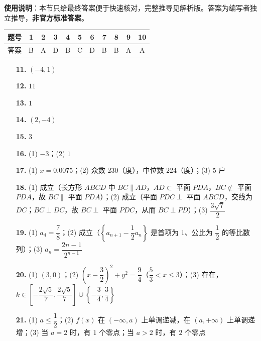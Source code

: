 
\begin{gknotice}
\textbf{使用说明}：本节只给最终答案便于快速核对，完整推导见解析版。答案为编写者独立推导，\textbf{非官方标准答案}。
\end{gknotice}

\begin{center}\begin{tabular}{ccccccccccc}
\toprule
题号 & 1 & 2 & 3 & 4 & 5 & 6 & 7 & 8 & 9 & 10 \\
\midrule
答案 & B & A & D & B & C & D & B & B & A & A \\
\bottomrule
\end{tabular}\end{center}

\begin{itemize}[leftmargin=2.6em]
  \item[\textbf{11.}] \((-4,1)\)
  \item[\textbf{12.}] \(11\)
  \item[\textbf{13.}] \(1\)
  \item[\textbf{14.}] \((2,-4)\)
  \item[\textbf{15.}] \(3\)
\end{itemize}

\begin{itemize}[leftmargin=2.6em]
  \item[\textbf{16.}] (1) \(-3\)；(2) \(1\)
  \item[\textbf{17.}] (1) \(x=0.0075\)；(2) 众数 \(230\)（度），中位数 \(224\)（度）；(3) \(5\) 户
  \item[\textbf{18.}] (1) 成立（长方形 \(ABCD\) 中 \(BC\parallel AD\)，\(AD\subset\) 平面 \(PDA\)，\(BC\not\subset\) 平面 \(PDA\)，故 \(BC\parallel\) 平面 \(PDA\)）；(2) 成立（平面 \(PDC\perp\) 平面 \(ABCD\)，交线为 \(DC\)；\(BC\perp DC\)，故 \(BC\perp\) 平面 \(PDC\)，从而 \(BC\perp PD\)）；(3) \(\dfrac{3\sqrt{7}}{2}\)
  \item[\textbf{19.}] (1) \(a_4=\dfrac{7}{8}\)；(2) 成立（\(\left\{a_{n+1}-\dfrac{1}{2}a_n\right\}\) 是首项为 \(1\)、公比为 \(\dfrac{1}{2}\) 的等比数列）；(3) \(a_n=\dfrac{2n-1}{2^{n-1}}\)
  \item[\textbf{20.}] (1) \((3,0)\)；(2) \(\left(x-\dfrac{3}{2}\right)^2+y^2=\dfrac{9}{4}\)（\(\dfrac{5}{3}<x\leqslant 3\)）；(3) 存在，\(k\in\left[-\dfrac{2\sqrt{5}}{7},\dfrac{2\sqrt{5}}{7}\right]\cup\left\{-\dfrac{3}{4},\dfrac{3}{4}\right\}\)
  \item[\textbf{21.}] (1) \(a\leqslant\dfrac{1}{2}\)；(2) \(f(x)\) 在 \((-\infty,a)\) 上单调递减，在 \((a,+\infty)\) 上单调递增；(3) 当 \(a=2\) 时，有 \(1\) 个零点；当 \(a>2\) 时，有 \(2\) 个零点
\end{itemize}
